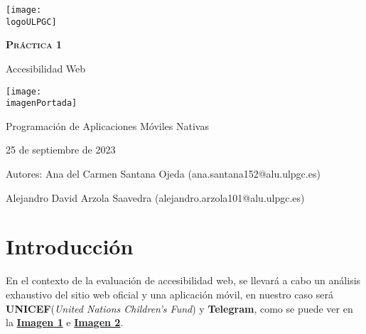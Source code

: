 \documentclass[a4paper]{article}
\newcommand{\dateToday}{25 de septiembre de 2023}
\newcommand{\logoULPGC}{ulpgc.png}
\newcommand{\imagenPortada}{discapacidad_principal.png}
\begin{document}
    \begin{titlepage}
        \centering
        \vspace*{2cm}
        \texttt{[image: \\logoULPGC]}\par\vspace{1cm}
    
        {\scshape\textbf{\LARGE Práctica 1}}\par
        \vspace{0.6cm}
        {\bfseries}{\Huge Accesibilidad Web}
        \vspace{2cm}
    
        \texttt{[image: \\imagenPortada]}\vspace{1cm}
            
        \begin{tcolorbox}[colback=red!5!white,colframe=white!50!black]
            \centering \Large Programación de Aplicaciones Móviles Nativas \par
            \dateToday
        \end{tcolorbox}

        \vspace{1cm}        
        \begin{tcolorbox}[colback=green!5!white,colframe=green!75!black]
            Autores:
            \tcblower
            Ana del Carmen Santana Ojeda (ana.santana152@alu.ulpgc.es)\par \vspace{0.5cm}
            Alejandro David Arzola Saavedra (alejandro.arzola101@alu.ulpgc.es)
        \end{tcolorbox}
    \end{titlepage}
    
    \newpage
        
    \tableofcontents 
    
    \newpage

    \section{Introducción}
    \label{sec:introduccion_desarrollo}
    En el contexto de la evaluación de accesibilidad web, se llevará a cabo un análisis exhaustivo del sitio web oficial y una aplicación móvil, en nuestro caso será \textbf{UNICEF}(\textit{United Nations Children's Fund}) y \textbf{Telegram}, como se puede ver en la \textbf{\hyperref[fig:imagen-unicef]{Imagen 1}} e \textbf{\hyperref[fig:imagen-telegram]{Imagen 2}}.\vspace{0.1cm}
\end{document}
